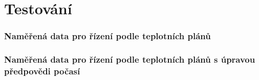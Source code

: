 \chapter{Testování}
\subsection{Naměřená data pro řízení podle teplotních plánů}
\subsection{Naměřená data pro řízení podle teplotních plánů s úpravou předpovědi počasí}